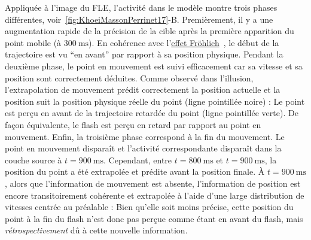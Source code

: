 \documentclass[11pt,french,a4paper,oneside]{article}%
\newcommand{\ms}{\si{\milli\second}}%
\begin{document}
Appliquée à l'image du FLE, l'activité dans le modèle montre trois
phases différentes, voir~\ref{fig:KhoeiMassonPerrinet17}-B. Premièrement, il y a une
augmentation rapide de la précision de la cible après la première
apparition du point mobile (à $300~\ms$). En cohérence avec
l'\href{https://en.wikipedia.org/wiki/Fröhlich_effect}{effet Fröhlich}~\citep{Jancke10}, le début de la trajectoire est vu ``en avant'' par rapport à sa
position physique. Pendant la deuxième phase, le point en mouvement est
suivi efficacement car sa vitesse et sa position sont correctement
déduites. Comme observé dans l'illusion, l'extrapolation de mouvement prédit correctement la
position actuelle et la position suit la position physique réelle du
point (ligne pointillée noire) : Le point est perçu en avant de la trajectoire retardée du point (ligne
pointillée verte).
De façon équivalente, le flash est perçu en retard par rapport au point en mouvement.
Enfin, la troisième phase correspond à
la fin du mouvement. Le point en mouvement disparaît et
l'activité correspondante disparaît dans la couche source à $t=900~\ms$.
Cependant, entre $t=800~\ms$ et $t=900~\ms$, la position du point a été
extrapolée et prédite avant la position finale. À $t=900~\ms$, alors que
l'information de mouvement est absente, l'information de position est
encore transitoirement cohérente et extrapolée à l'aide d'une large
distribution de vitesses centrée au préalable : Bien qu'elle soit moins
précise, cette position du point à la fin du flash n'est donc pas perçue comme étant en avant du flash, mais \emph{rétrospectivement} dû à cette nouvelle information.
\end{document}
